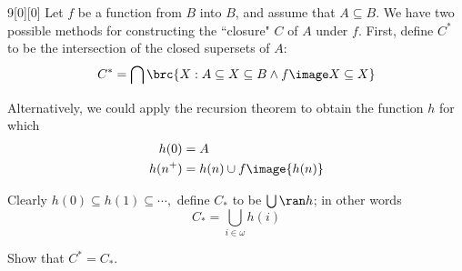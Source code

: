 \documentclass{article}
\begin{document}
\begin{hw}{9}[0][0]
	Let $f$ be a function from $B$ into $B$, and assume that $A \subseteq B$. We have two possible methods for constructing the ``closure" $C$ of $A$ under $f$. First, define $C^{*}$ to be the intersection of the closed supersets of $A$:
	\begin{equation*}
		C^{*} = \bigcap \brc{X : A \subseteq X \subseteq B \land f\image X \subseteq X}
	\end{equation*}

	Alternatively, we could apply the recursion theorem to obtain the function $h$ for which
	\begin{align*}
		h(0) &= A \\
		h(n^{+}) &= h(n) \cup f\image{h(n)}
	\end{align*}

	Clearly $h(0) \subseteq h(1) \subseteq \cdots,$ define $C_{*}$ to be $\bigcup \ran h$; in other words
	\begin{equation*}
		C_{*} = \bigcup_{i\in\omega} h(i)
	\end{equation*}

	Show that $C^{*} = C_{*}$.
\end{hw}
\end{document}
